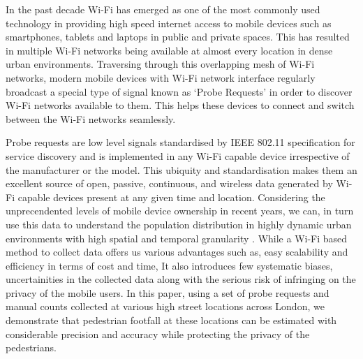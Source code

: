 In the past decade Wi-Fi has emerged as one of the most commonly used technology
in providing high speed internet access to mobile devices such as smartphones,
tablets and laptops in public and private spaces. This has resulted in multiple
Wi-Fi networks being available at almost every location in dense urban
environments. Traversing through this overlapping mesh of Wi-Fi networks, modern
mobile devices with Wi-Fi network interface regularly broadcast a special type
of signal known as `Probe Requests' in order to discover Wi-Fi networks
available to them.  This helps these devices to connect and switch between the
Wi-Fi networks seamlessly.

Probe requests are low level signals standardised by IEEE 802.11 specification
\citep{ieee2016} for service discovery and is implemented in any Wi-Fi capable
device irrespective of the manufacturer or the model. This ubiquity and
standardisation makes them an excellent source of open, passive, continuous,
and wireless data generated by Wi-Fi capable devices present at any given time
and location. Considering the unprecendented levels of mobile device ownership
in recent years, we can, in turn use this data to understand the population
distribution in highly dynamic urban environments with high spatial and
temporal granularity \citep{freud2015,konto2017}. While a Wi-Fi based method to
collect data offers us various advantages such as, easy scalability and
efficiency in terms of cost and time, It also introduces few systematic biases,
uncertainities in the collected data along with the serious risk of infringing
on the privacy of the mobile users. In this paper, using a set of probe
requests and manual counts collected at various high street locations across
London, we demonstrate that pedestrian footfall at these locations can be
estimated with considerable precision and accuracy while protecting the privacy
of the pedestrians.

